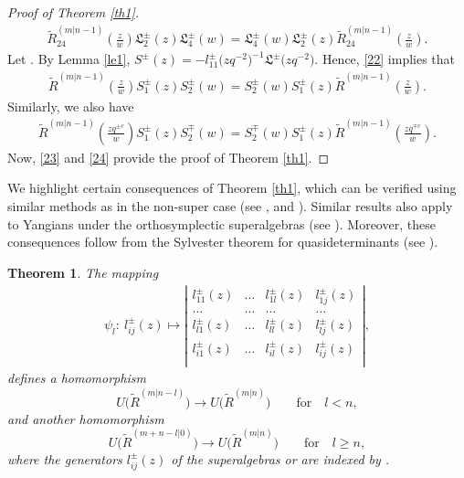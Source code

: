 \documentclass[pdftex]{sigma}
\numberwithin{equation}{section}
\newtheorem{Theorem}{Theorem}[section]
\begin{document}
\begin{proof}[Proof of Theorem \ref{th1}]
\begin{gather}
 \widetilde{R}_{24}^{(m|n-1)}\left(\frac{z}{w}\right) \mathfrak{L}_2^{\pm}(z)\mathfrak{L}_4^{\pm}(w)=\mathfrak{L}_4^{\pm}(w)\mathfrak{L}_2^{\pm}(z)\widetilde{R}_{24}^{(m|n-1)}\left(\frac{z}{w}\right).
\end{gather}
Let
.
By Lemma \ref{le1},
$S^{\pm}(z)=-l_{11}^{\pm}\bigl(zq^{-2}\bigr)^{-1}\mathfrak{L}^{\pm}\bigl(zq^{-2}\bigr)$.
Hence, \eqref{22} implies that
\begin{gather}\label{23}
 \widetilde{R}^{(m|n-1)}\left(\frac{z}{w}\right) S_1^{\pm}(z)S_2^{\pm}(w)=S_2^{\pm}(w)S_1^{\pm}(z) \widetilde{R}^{(m|n-1)}\left(\frac{z}{w}\right).
\end{gather}
Similarly, we also have
\begin{gather}\label{24}
 \widetilde{R}^{(m|n-1)}\left(\frac{zq^{\pm c}}{w}\right) S_1^{\pm}(z)S_2^{\mp}(w)=S_2^{\mp}(w)S_1^{\pm}(z) \widetilde{R}^{(m|n-1)}\left(\frac{zq^{\mp c}}{w}\right).
\end{gather}
Now, \eqref{23} and \eqref{24} provide the proof of Theorem \ref{th1}.
\end{proof}

We highlight certain consequences of Theorem \ref{th1}, which can be verified using similar methods as in the non-super case (see \cite[Theorem 3.9]{JMA}, and \cite[Theorem 3.7]{JMAB}). Similar results also apply to Yangians under the orthosymplectic superalgebras (see \cite[Corollary 3.2]{AIM}). Moreover, these consequences follow from the Sylvester theorem for quasideterminants (see \cite{IMG,DKBM}).

\begin{Theorem}\label{th2}
The mapping
\begin{align}\label{25}
\psi_l\colon\ l_{ij}^{\pm}(z)\mapsto
\left|
 \begin{matrix}
 l_{11}^{\pm}(z) & \ldots & l_{1l}^{\pm}(z) & l_{1j}^{\pm}(z) \\
 \ldots & \ldots & \ldots & \ldots \\
 l_{l1}^{\pm}(z) & \ldots & l_{ll}^{\pm}(z) & l_{lj}^{\pm}(z) \\
 l_{i1}^{\pm}(z) & \ldots & l_{il}^{\pm}(z) & \boxed{l_{ij}^{\pm}(z)} \\
 \end{matrix}
\right|,
\end{align}defines a homomorphism
\begin{equation*}
 U\bigl(\widetilde{R}^{(m|n-l)}\bigr)\rightarrow U\bigl(\widetilde{R}^{(m|n)}\bigr)\qquad \text{for} \quad l<n,
\end{equation*}and another homomorphism
\begin{equation*}
 U\bigl(\widetilde{R}^{(m+n-l|0)}\bigr)\rightarrow U\bigl(\widetilde{R}^{(m|n)}\bigr)\qquad \text{for} \quad l\geq n,
\end{equation*}
where the generators $l_{ij}^{\pm}(z)$ of the superalgebras  or  are indexed by .
\end{Theorem}
\end{document}
